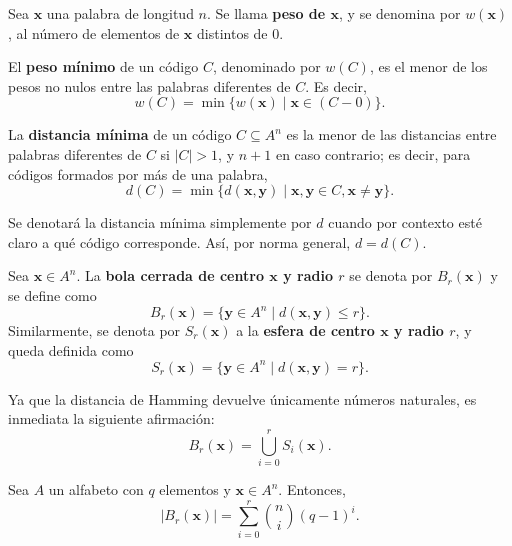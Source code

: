 \begin{definition}
	Sea $\textbf{x}$ una palabra de longitud $n$. Se llama \textbf{peso de $\textbf{x}$}, y se denomina por $w(\textbf{x})$, al número de elementos de $\textbf{x}$ distintos de $0$.
\end{definition}

\begin{definition}
	El \textbf{peso mínimo} de un código $C$, denominado por $w(C)$, es el menor de los pesos no nulos entre las palabras diferentes de $C$. Es decir,
	\[w(C) = \min\{w(\textbf{x}) \mid \textbf{x}\in (C - 0)\}.\]
\end{definition}

\begin{definition}
	La \textbf{distancia mínima} de un código $C \subseteq A^n$ es la menor de las distancias entre palabras diferentes de $C$ si $|C| > 1$, y $n+1$ en caso contrario; es decir, para códigos formados por más de una palabra,
	\[d(C) = \min\{d(\textbf{x}, \textbf{y}) \mid \textbf{x}, \textbf{y} \in C, \textbf{x}\neq\textbf{y}\}.\]
	
	\begin{remark}
		Se denotará la distancia mínima simplemente por $d$ cuando por contexto esté claro a qué código corresponde. Así, por norma general, $d = d(C)$.
	\end{remark}
\end{definition}

\begin{definition}
	Sea $\textbf{x} \in A^n$. La \textbf{bola cerrada de centro $\textbf{x}$ y radio $r$} se denota por $B_r(\textbf{x})$ y se define como
	\[B_r(\textbf{x}) = \{\textbf{y} \in A^n \mid d(\textbf{x}, \textbf{y}) \leq r\}.\]
	Similarmente, se denota por $S_r(\textbf{x})$ a la \textbf{esfera de centro $\textbf{x}$ y radio $r$}, y queda definida como
	\[S_r(\textbf{x}) = \{\textbf{y} \in A^n \mid d(\textbf{x}, \textbf{y}) = r\}.\]
	\begin{remark}
		Ya que la distancia de Hamming devuelve únicamente números naturales, es inmediata la siguiente afirmación:
		\[B_r(\textbf{x}) = \bigcup_{i=0}^r S_i(\textbf{x}).\]
	\end{remark}
\end{definition}

\begin{theorem}
	Sea $A$ un alfabeto con $q$ elementos y $\textbf{x} \in A^n$. Entonces,
	\[|B_r(\textbf{x})| = \sum_{i=0}^r\binom{n}{i}(q - 1)^i.\]
\end{theorem}

